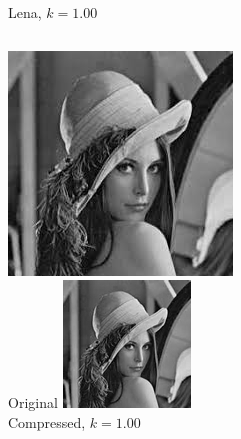 \documentclass[12pt]{beamer}
\begin{document}
\begin{frame}{Lena, \(k=1.00\)}
  \begin{columns}
      \includegraphics[width=\textwidth]{Lena.jpeg}\\
      \footnotesize Original
      \includegraphics[width=\textwidth]{Lena_k100.png}\\
      \footnotesize Compressed, \(k=1.00\)
  \end{columns}
\end{frame}
\end{document}
